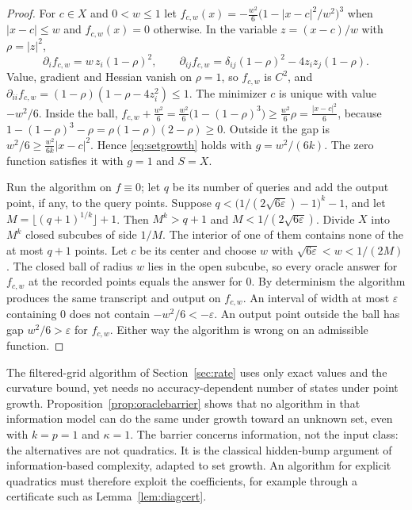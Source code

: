 \begin{proof}
For $c\in X$ and $0<w\le1$ let
$f_{c,w}(x)=-\frac{w^2}6\bigl(1-|x-c|^2/w^2\bigr)^3$ when $|x-c|\le w$ and
$f_{c,w}(x)=0$ otherwise. In the variable $z=(x-c)/w$ with $\rho=|z|^2$,
\[
\partial_if_{c,w}=w\,z_i(1-\rho)^2,\qquad
\partial_{ij}f_{c,w}=\delta_{ij}(1-\rho)^2-4z_iz_j(1-\rho).
\]
Value, gradient and Hessian vanish on $\rho=1$, so $f_{c,w}$ is $C^2$, and
$\partial_{ii}f_{c,w}=(1-\rho)(1-\rho-4z_i^2)\le1$. The minimizer $c$ is
unique with value $-w^2/6$. Inside the ball,
$f_{c,w}+\frac{w^2}6=\frac{w^2}6\bigl(1-(1-\rho)^3\bigr)\ge\frac{w^2}6\rho
=\frac{|x-c|^2}6$, because $1-(1-\rho)^3-\rho=\rho(1-\rho)(2-\rho)\ge0$.
Outside it the gap is $w^2/6\ge\frac{w^2}{6k}|x-c|^2$. Hence
\eqref{eq:setgrowth} holds with $g=w^2/(6k)$. The zero function satisfies it
with $g=1$ and $S=X$.

Run the algorithm on $f\equiv0$; let $q$ be its number of queries and add
the output point, if any, to the query points. Suppose
$q<\bigl(1/(2\sqrt{6\varepsilon})-1\bigr)^k-1$, and let
$M=\lfloor(q+1)^{1/k}\rfloor+1$. Then $M^k>q+1$ and $M<1/(2\sqrt{6\varepsilon})$.
Divide $X$ into $M^k$ closed subcubes of side $1/M$. The interior of one of
them contains none of the at most $q+1$ points. Let $c$ be its center and
choose $w$ with $\sqrt{6\varepsilon}<w<1/(2M)$. The closed ball of radius $w$
lies in the open subcube, so every oracle answer for $f_{c,w}$ at the
recorded points equals the answer for $0$. By determinism the algorithm
produces the same transcript and output on $f_{c,w}$. An interval of width at
most $\varepsilon$ containing $0$ does not contain $-w^2/6<-\varepsilon$. An
output point outside the ball has gap $w^2/6>\varepsilon$ for $f_{c,w}$.
Either way the algorithm is wrong on an admissible function.
\end{proof}

The filtered-grid algorithm of Section~\ref{sec:rate} uses only exact values
and the curvature bound, yet needs no accuracy-dependent number of states under
point growth. Proposition~\ref{prop:oraclebarrier} shows that no algorithm in
that information model can do the same under growth toward an unknown set,
even with $k=p=1$ and $\kappa=1$. The barrier concerns information, not the
input class: the alternatives are not quadratics. It is the classical
hidden-bump argument of information-based complexity, adapted to set growth.
An algorithm for explicit quadratics must therefore exploit the coefficients,
for example through a certificate such as Lemma~\ref{lem:diagcert}.

